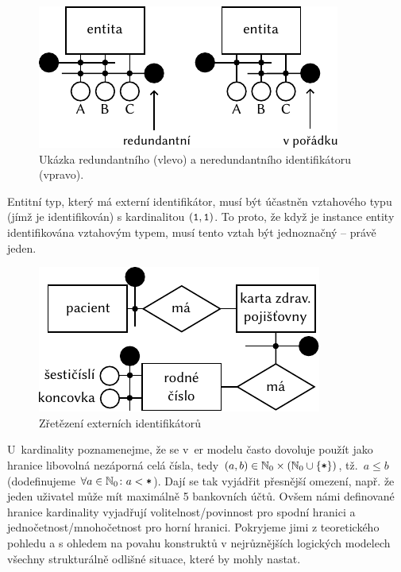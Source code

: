 \begin{figure}[!htb]
  \centering
  \includegraphics[width=\maxwidth{\textwidth}]{../img/er-model/redundant-ids.pdf}
  \caption{Ukázka redundantního (vlevo) a neredundantního identifikátoru (vpravo).}
  \label{fig:redundant-ids}
\end{figure}

Entitní typ, který má externí identifikátor, musí být účastněn vztahového typu (jímž je identifikován) s kardinalitou $(\texttt{1},\texttt{1})$.
To proto, že když je instance entity identifikována vztahovým typem, musí tento vztah být jednoznačný -- právě jeden.

\begin{figure}[!htb]
  \centering
  \includegraphics[width=\maxwidth{\textwidth}]{../img/er-model/external-id-chain.pdf}
  \caption{Zřetězení externích identifikátorů}
  \label{fig:er-external-identifier-chain}
\end{figure}

U~kardinality poznamenejme, že se v~\acrshort{er} modelu často dovoluje použít jako hranice libovolná nezáporná celá čísla, tedy $(a, b)\in \mathbb N_0\times \left(\mathbb N_0 \cup \left\{\texttt{*}\right\}\right)$, tž.~$a\leq b$ (dodefinujeme $\forall a\in\mathbb N_0\colon a < \texttt{*}$).
Dají se tak vyjádřit přesnější omezení, např. že jeden uživatel může mít maximálně 5 bankovních účtů.
Ovšem námi definované hranice kardinality vyjadřují volitelnost/povinnost pro spodní hranici a jednočetnost/mnohočetnost pro horní hranici.
Pokryjeme jimi z teoretického pohledu a s ohledem na povahu konstruktů v nejrůznějších logických modelech všechny strukturálně odlišné situace, které by mohly nastat.

